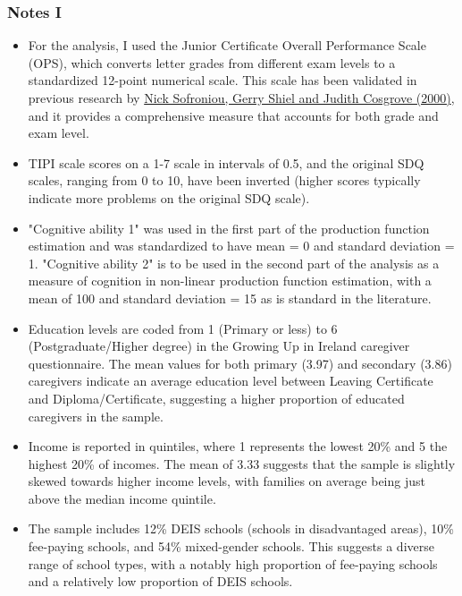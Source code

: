 \documentclass{beamer}
\begin{document}
\begin{frame}
\frametitle{Notes I}
\hypertarget{NotesI}{}
\tiny
\begin{itemize}
\item For the analysis, I used the Junior Certificate Overall Performance Scale (OPS), which converts letter grades from different exam levels to a standardized 12-point numerical scale. This scale has been validated in previous research by \href{https://www.jstor.org/stable/pdf/30077469.pdf}{Nick Sofroniou, Gerry Shiel and Judith Cosgrove (2000)}, and it provides a comprehensive measure that accounts for both grade and exam level.
\item TIPI scale scores on a 1-7 scale in intervals of 0.5, and the original SDQ scales, ranging from 0 to 10, have been inverted (higher scores typically indicate more problems on the original SDQ scale). 
\item "Cognitive ability 1" was used in the first part of the production function estimation and was standardized to have mean = 0 and standard deviation = 1. "Cognitive ability 2" is to be used in the second part of the analysis as a measure of cognition in non-linear production function estimation, with a mean of 100 and standard deviation = 15 as is standard in the literature. 
\item Education levels are coded from 1 (Primary or less) to 6 (Postgraduate/Higher degree) in the Growing Up in Ireland caregiver questionnaire. The mean values for both primary (3.97) and secondary (3.86) caregivers indicate an average education level between Leaving Certificate and Diploma/Certificate, suggesting a higher proportion of educated caregivers in the sample. 
\item Income is reported in quintiles, where 1 represents the lowest 20\% and 5 the highest 20\% of incomes. The mean of 3.33 suggests that the sample is slightly skewed towards higher income levels, with families on average being just above the median income quintile. \item The sample includes 12\% DEIS schools (schools in disadvantaged areas), 10\% fee-paying schools, and 54\% mixed-gender schools. This suggests a diverse range of school types, with a notably high proportion of fee-paying schools and a relatively low proportion of DEIS schools.
\end{itemize}
\vfill
\hfill
\hyperlink{Timeline}{}
\end{frame}
\end{document}
